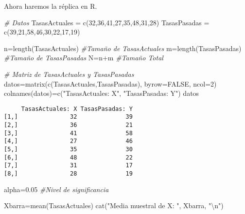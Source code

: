 \documentclass[
  a4paper,
  oneside,
  openany]{book}
\newenvironment{Shaded}{\begin{snugshade}}{\end{snugshade}}
\newcommand{\AttributeTok}[1]{\textcolor[rgb]{0.77,0.63,0.00}{#1}}
\newcommand{\CommentTok}[1]{\textcolor[rgb]{0.56,0.35,0.01}{\textit{#1}}}
\newcommand{\ConstantTok}[1]{\textcolor[rgb]{0.00,0.00,0.00}{#1}}
\newcommand{\DecValTok}[1]{\textcolor[rgb]{0.00,0.00,0.81}{#1}}
\newcommand{\FloatTok}[1]{\textcolor[rgb]{0.00,0.00,0.81}{#1}}
\newcommand{\FunctionTok}[1]{\textcolor[rgb]{0.00,0.00,0.00}{#1}}
\newcommand{\NormalTok}[1]{#1}
\newcommand{\OtherTok}[1]{\textcolor[rgb]{0.56,0.35,0.01}{#1}}
\newcommand{\SpecialCharTok}[1]{\textcolor[rgb]{0.00,0.00,0.00}{#1}}
\newcommand{\StringTok}[1]{\textcolor[rgb]{0.31,0.60,0.02}{#1}}
\begin{document}
Ahora haremos la réplica en R.

\begin{Shaded}
\begin{Highlighting}[]
\CommentTok{\# Datos}
\NormalTok{TasasActuales }\OtherTok{=} \FunctionTok{c}\NormalTok{(}\DecValTok{32}\NormalTok{,}\DecValTok{36}\NormalTok{,}\DecValTok{41}\NormalTok{,}\DecValTok{27}\NormalTok{,}\DecValTok{35}\NormalTok{,}\DecValTok{48}\NormalTok{,}\DecValTok{31}\NormalTok{,}\DecValTok{28}\NormalTok{)}
\NormalTok{TasasPasadas }\OtherTok{=} \FunctionTok{c}\NormalTok{(}\DecValTok{39}\NormalTok{,}\DecValTok{21}\NormalTok{,}\DecValTok{58}\NormalTok{,}\DecValTok{46}\NormalTok{,}\DecValTok{30}\NormalTok{,}\DecValTok{22}\NormalTok{,}\DecValTok{17}\NormalTok{,}\DecValTok{19}\NormalTok{)}

\NormalTok{n}\OtherTok{=}\FunctionTok{length}\NormalTok{(TasasActuales)  }\CommentTok{\#Tamaño de TasasActuales}
\NormalTok{m}\OtherTok{=}\FunctionTok{length}\NormalTok{(TasasPasadas)   }\CommentTok{\#Tamaño de TasasPasadas}
\NormalTok{N}\OtherTok{=}\NormalTok{n}\SpecialCharTok{+}\NormalTok{m                    }\CommentTok{\#Tamaño Total}

\CommentTok{\# Matriz de TasasActuales y TasasPasadas}
\NormalTok{datos}\OtherTok{=}\FunctionTok{matrix}\NormalTok{(}\FunctionTok{c}\NormalTok{(TasasActuales,TasasPasadas), }\AttributeTok{byrow=}\ConstantTok{FALSE}\NormalTok{, }\AttributeTok{ncol=}\DecValTok{2}\NormalTok{)}
\FunctionTok{colnames}\NormalTok{(datos)}\OtherTok{=}\FunctionTok{c}\NormalTok{(}\StringTok{"TasasActuales: X"}\NormalTok{, }\StringTok{"TasasPasadas: Y"}\NormalTok{)}
\NormalTok{datos}
\end{Highlighting}
\end{Shaded}

\begin{verbatim}
     TasasActuales: X TasasPasadas: Y
[1,]               32              39
[2,]               36              21
[3,]               41              58
[4,]               27              46
[5,]               35              30
[6,]               48              22
[7,]               31              17
[8,]               28              19
\end{verbatim}

\begin{Shaded}
\begin{Highlighting}[]
\NormalTok{alpha}\OtherTok{=}\FloatTok{0.05}  \CommentTok{\#Nivel de significancia }

\NormalTok{Xbarra}\OtherTok{=}\FunctionTok{mean}\NormalTok{(TasasActuales)}
\FunctionTok{cat}\NormalTok{(}\StringTok{"Media muestral de X: "}\NormalTok{, Xbarra, }\StringTok{"}\SpecialCharTok{\textbackslash{}n}\StringTok{"}\NormalTok{)}
\end{Highlighting}
\end{Shaded}
\end{document}
